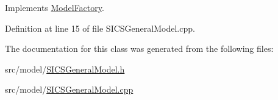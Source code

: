 Implements \hyperlink{classModelFactory_adfa2a321dba41b9ba05e7805b9bfac2b}{Model\+Factory}.



Definition at line 15 of file S\+I\+C\+S\+General\+Model.\+cpp.



The documentation for this class was generated from the following files\+:\begin{DoxyCompactItemize}
\item 
src/model/\hyperlink{SICSGeneralModel_8h}{S\+I\+C\+S\+General\+Model.\+h}\item 
src/model/\hyperlink{SICSGeneralModel_8cpp}{S\+I\+C\+S\+General\+Model.\+cpp}\end{DoxyCompactItemize}
